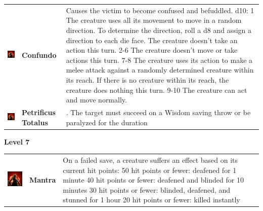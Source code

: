\begin{tabular}{ m{4cm}m{3cm}m{6cm} } 
	\includegraphics[width=4cm]{../Pictures/Gameplay/Spells/Icon/spell_icon.png} & \textbf{Confundo} & Causes the victim to become confused and befuddled. d10:
1	The creature uses all its movement to move in a random direction. To determine the direction, roll a d8 and assign a direction to each die face. The creature doesn't take an action this turn.
2-6	The creature doesn't move or take actions this turn.
7-8	The creature uses its action to make a melee attack against a randomly determined creature within its reach. If there is no creature within its reach, the creature does nothing this turn.
9-10	The creature can act and move normally.\\ 
	\includegraphics[width=4cm]{../Pictures/Gameplay/Spells/Icon/spell_icon.png} & \textbf{Petrificus Totalus} & . The target must succeed on a Wisdom saving throw or be paralyzed for the duration \\ 
\end{tabular}
\textbf{Level 7 } 
\begin{tabular}{ m{4cm}m{3cm}m{6cm} } 
	\includegraphics[width=4cm]{../Pictures/Gameplay/Spells/Icon/spell_icon.png} & \textbf{Mantra} & On a failed save, a creature suffers an effect based on its current hit points:
50 hit points or fewer: deafened for 1 minute
40 hit points or fewer: deafened and blinded for 10 minutes
30 hit points or fewer: blinded, deafened, and stunned for 1 hour
20 hit points or fewer: killed instantly \\ %
\end{tabular}
